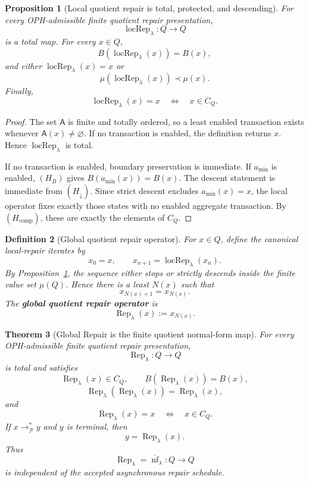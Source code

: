 \documentclass[11pt]{article}
\newtheorem{theorem}{Theorem}[section]
\newtheorem{definition}[theorem]{Definition}
\newtheorem{proposition}[theorem]{Proposition}
\theoremstyle{remark}
\theoremstyle{plain}
\begin{document}
\begin{proposition}[Local quotient repair is total, protected, and descending]\label{prop:local-quotient-repair}
For every OPH-admissible finite quotient repair presentation,
\[
\operatorname{locRep}_\lambda:Q\to Q
\]
is a total map.  For every \(x\in Q\),
\[
B(\operatorname{locRep}_\lambda(x))=B(x),
\]
and either \(\operatorname{locRep}_\lambda(x)=x\) or
\[
\mu(\operatorname{locRep}_\lambda(x))\prec\mu(x).
\]
Finally,
\[
\operatorname{locRep}_\lambda(x)=x
\quad\Longleftrightarrow\quad
x\in C_Q.
\]
\end{proposition}

\begin{proof}
The set \(\mathsf A\) is finite and totally ordered, so a least enabled transaction exists whenever
\(\mathsf A(x)\ne\varnothing\).  If no transaction is enabled, the definition returns \(x\).  Hence
\(\operatorname{locRep}_\lambda\) is total.

If no transaction is enabled, boundary preservation is immediate.  If \(a_{\min}\) is enabled,
\((H_B)\) gives \(B(a_{\min}(x))=B(x)\).  The descent statement is immediate from
\((H_\downarrow)\).  Since strict descent excludes \(a_{\min}(x)=x\), the local operator fixes
exactly those states with no enabled aggregate transaction.  By \((H_{\mathrm{comp}})\), these are
exactly the elements of \(C_Q\).
\end{proof}

\begin{definition}[Global quotient repair operator]\label{def:global-quotient-repair-operator}
For \(x\in Q\), define the canonical local-repair iterates by
\[
x_0=x,\qquad x_{n+1}=\operatorname{locRep}_\lambda(x_n).
\]
By Proposition~\ref{prop:local-quotient-repair}, the sequence either stops or strictly descends
inside the finite value set \(\mu(Q)\).  Hence there is a least \(N(x)\) such that
\[
x_{N(x)+1}=x_{N(x)}.
\]
The \textbf{global quotient repair operator} is
\[
\operatorname{Rep}_\lambda(x):=x_{N(x)}.
\]
\end{definition}

\begin{theorem}[Global Repair is the finite quotient normal-form map]\label{thm:quotient-repair-normal-form}
For every OPH-admissible finite quotient repair presentation,
\[
\operatorname{Rep}_\lambda:Q\to Q
\]
is total and satisfies
\[
\operatorname{Rep}_\lambda(x)\in C_Q,\qquad
B(\operatorname{Rep}_\lambda(x))=B(x),
\]
\[
\operatorname{Rep}_\lambda(\operatorname{Rep}_\lambda(x))
=
\operatorname{Rep}_\lambda(x),
\]
and
\[
\operatorname{Rep}_\lambda(x)=x
\quad\Longleftrightarrow\quad
x\in C_Q.
\]
If \(x\to_{\mathcal P}^{\!*}y\) and \(y\) is terminal, then
\[
y=\operatorname{Rep}_\lambda(x).
\]
Thus
\[
\operatorname{Rep}_\lambda=\overline{\operatorname{nf}}_\lambda:Q\to Q
\]
is independent of the accepted asynchronous repair schedule.
\end{theorem}
\end{document}
